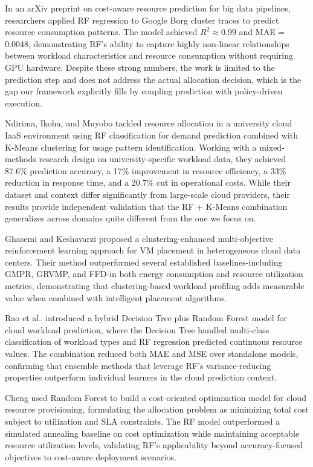\documentclass[conference]{IEEEtran}
\begin{document}
In an arXiv preprint on cost-aware resource prediction for big data pipelines, researchers applied RF regression to Google Borg cluster traces to predict resource consumption patterns. The model achieved $R^2 \approx 0.99$ and MAE = 0.0048, demonstrating RF's ability to capture highly non-linear relationships between workload characteristics and resource consumption without requiring GPU hardware. Despite these strong numbers, the work is limited to the prediction step and does not address the actual allocation decision, which is the gap our framework explicitly fills by coupling prediction with policy-driven execution.~\cite{Ref9}

Ndirima, Ikoha, and Muyobo tackled resource allocation in a university cloud IaaS environment using RF classification for demand prediction combined with K-Means clustering for usage pattern identification. Working with a mixed-methods research design on university-specific workload data, they achieved 87.6\% prediction accuracy, a 17\% improvement in resource efficiency, a 33\% reduction in response time, and a 20.7\% cut in operational costs. While their dataset and context differ significantly from large-scale cloud providers, their results provide independent validation that the RF + K-Means combination generalizes across domains quite different from the one we focus on.~\cite{Ref10}

Ghasemi and Keshavarzi proposed a clustering-enhanced multi-objective reinforcement learning approach for VM placement in heterogeneous cloud data centers. Their method outperformed several established baselines-including GMPR, GRVMP, and FFD-in both energy consumption and resource utilization metrics, demonstrating that clustering-based workload profiling adds measurable value when combined with intelligent placement algorithms.~\cite{Ref11}

Rao et al.\ introduced a hybrid Decision Tree plus Random Forest model for cloud workload prediction, where the Decision Tree handled multi-class classification of workload types and RF regression predicted continuous resource values. The combination reduced both MAE and MSE over standalone models, confirming that ensemble methods that leverage RF's variance-reducing properties outperform individual learners in the cloud prediction context.~\cite{Ref12}

Cheng used Random Forest to build a cost-oriented optimization model for cloud resource provisioning, formulating the allocation problem as minimizing total cost subject to utilization and SLA constraints. The RF model outperformed a simulated annealing baseline on cost optimization while maintaining acceptable resource utilization levels, validating RF's applicability beyond accuracy-focused objectives to cost-aware deployment scenarios.~\cite{Ref13}
\end{document}
